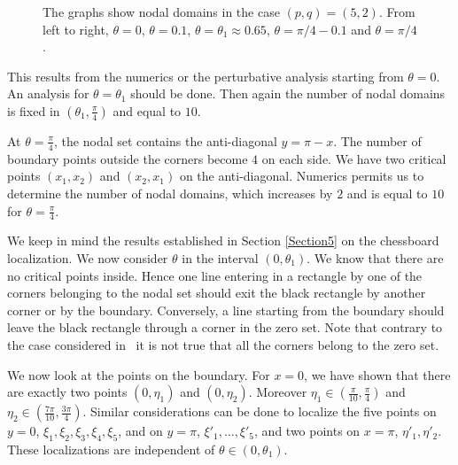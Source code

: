 \documentclass[a4paper,reqno,11pt]{amsart}
\theoremstyle{remark}
\theoremstyle{definition}
\numberwithin{equation}{section}
\begin{document}
\begin{figure}[htp]
\centering
{}
\caption{The graphs show nodal domains in the case $(p,q)=(5,2)$. From left
to right, $\theta=0$, $\theta=0.1$, $\theta=\theta_1\approx 0.65$, $\theta=\pi/4-0.1$ and
$\theta=\pi/4$.}
\label{fig:5-2}
\end{figure}

This results  from the numerics or the perturbative analysis starting 
from $\theta=0$.  An analysis for $\theta=\theta_1$ should be done. Then again 
the number of nodal domains is fixed in $(\theta_1,\frac \pi 4)$ and equal to $10$.

At $\theta =\frac \pi 4$, the nodal set contains the anti-diagonal 
$y = \pi -x$. 
The number of boundary points  outside the corners  become $4$ on each side.
We have two critical points $(x_1,x_2)$ and $(x_2,x_1)$ on the anti-diagonal.
Numerics  permits  us  to determine the number of nodal domains, which 
increases by $2$ and is equal to $10$ for $\theta=\frac \pi 4$.

We  keep in mind the results established in Section \ref{Section5} on the 
chessboard localization.  We now consider $\theta$ in the interval 
$(0,\theta_1)$. We know that there are 
no critical points inside. Hence one line entering in a rectangle by one of the 
corners belonging to the nodal set should exit the black rectangle by another 
corner or by the boundary. Conversely, a line starting from the boundary should 
leave the black rectangle through a corner in the zero set. Note that contrary 
to the case considered in~\cite{BH} it is not true that all the corners belong 
to the zero set.

We now look at the points on the boundary. For $x=0$, we have shown that there 
are exactly two points $(0,\eta_1)$ and $(0,\eta_2)$. Moreover 
$\eta_1\in ( \frac{ \pi}{10}, \frac{\pi}{4})$ and 
$\eta_2 \in (\frac{7\pi}{10}, \frac{3\pi}{4})$. Similar considerations can be 
done to localize the five points on $y=0$, $\xi_1,\xi_2,\xi_3,\xi_4,\xi_5$,  and on 
$y=\pi$, $\xi'_1,\dots,\xi'_5$, and two points on $x=\pi$, $ \eta'_1, \eta'_2$. These 
localizations are independent of $\theta \in (0,\theta_1)$. 
\end{document}
